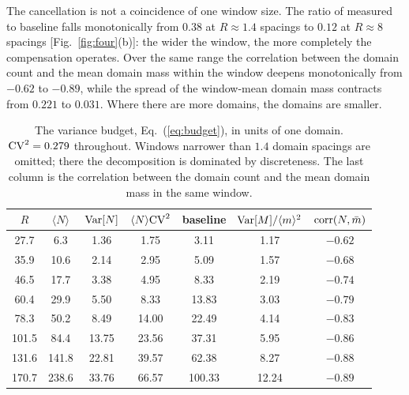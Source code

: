 \documentclass[aps,pre,twocolumn,superscriptaddress,floatfix,longbibliography]{revtex4-2}
\begin{document}
The cancellation is not a coincidence of one window size. The ratio of
measured to baseline falls monotonically from $0.38$ at $R \approx 1.4$
spacings to $0.12$ at $R \approx 8$ spacings [Fig.~\ref{fig:four}(b)]: the wider the
window, the more completely the compensation operates. Over the same range the
correlation between the domain count and the mean domain mass within the
window deepens monotonically from $-0.62$ to $-0.89$, while the spread of the
window-mean domain mass contracts from $0.221$ to $0.031$. Where there are
more domains, the domains are smaller.

\begin{table}[t]
\caption{The variance budget, Eq.~(\ref{eq:budget}), in units of one domain.
${\rm CV}^2 = 0.279$ throughout. Windows narrower than $1.4$ domain spacings
are omitted; there the decomposition is dominated by discreteness. The last
column is the correlation between the domain count and the mean domain mass in
the same window.}
\label{tab:budget}
\begin{ruledtabular}
\begin{tabular}{ccccccc}
$R$ & $\langle N\rangle$ & ${\rm Var}[N]$ & $\langle N\rangle{\rm CV}^2$ &
baseline & ${\rm Var}[M]/\langle m\rangle^2$ & ${\rm corr}(N,\bar m)$ \\
\hline
 27.7 &   6.3 &  1.36 &  1.75 &   3.11 &  1.17 & $-0.62$ \\
 35.9 &  10.6 &  2.14 &  2.95 &   5.09 &  1.57 & $-0.68$ \\
 46.5 &  17.7 &  3.38 &  4.95 &   8.33 &  2.19 & $-0.74$ \\
 60.4 &  29.9 &  5.50 &  8.33 &  13.83 &  3.03 & $-0.79$ \\
 78.3 &  50.2 &  8.49 & 14.00 &  22.49 &  4.14 & $-0.83$ \\
101.5 &  84.4 & 13.75 & 23.56 &  37.31 &  5.95 & $-0.86$ \\
131.6 & 141.8 & 22.81 & 39.57 &  62.38 &  8.27 & $-0.88$ \\
170.7 & 238.6 & 33.76 & 66.57 & 100.33 & 12.24 & $-0.89$ \\
\end{tabular}
\end{ruledtabular}
\end{table}
\end{document}
